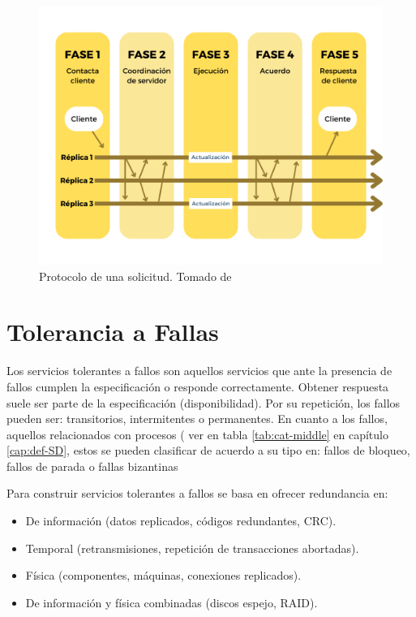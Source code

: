  \begin{figure}%
 \includegraphics {9/3.png} 
 \caption{Protocolo de una solicitud. Tomado de \cite{Pedone2000}}
 \label{fig:protocol-sol}
 \end{figure}
 
 \section{Tolerancia a Fallas}
   
   Los servicios tolerantes a fallos son aquellos servicios que ante la  presencia de fallos cumplen la especificación  o responde correctamente.
   Obtener respuesta suele ser parte de la especificación (disponibilidad).
   Por su repetición, los fallos pueden ser:   transitorios,  intermitentes o permanentes.
   En cuanto a los fallos, aquellos relacionados con procesos ( ver en tabla \ref{tab:cat-middle} en cap\'itulo \ref{cap:def-SD}, estos se pueden clasificar de acuerdo a su  tipo en:  fallos de bloqueo,   fallos de parada o  fallas bizantinas
   
   
   Para construir servicios tolerantes a fallos se basa en ofrecer redundancia en:
   \begin{itemize}
   	\item De información (datos replicados, códigos redundantes, CRC).
   	 \item Temporal (retransmisiones, repetición de transacciones abortadas).
   	 \item Física (componentes, máquinas, conexiones replicados).
   	  \item De información y física combinadas (discos espejo, RAID).
   \end{itemize}
   
